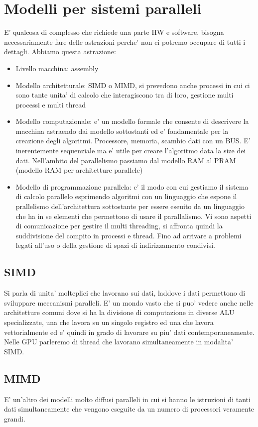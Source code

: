 \section{Modelli per sistemi paralleli}
E' qualcosa di complesso che richiede una parte HW e software, bisogna necessariamente fare delle astrazioni perche' non ci potremo occupare di tutti i dettagli.
Abbiamo questa astrazione:
\begin{itemize}
    \item Livello macchina: assembly
    \item Modello architetturale: SIMD o MIMD, si prevedono anche processi in cui ci sono tante unita' di calcolo che interagiscono tra di loro, gestione multi processi e multi thread
    \item Modello computazionale: e' un modello formale che consente di descrivere la macchina astraendo dai modello sottostanti ed e' fondamentale per la creazione degli algoritmi. Processore, memoria, scambio dati con un BUS. E' inerentemente sequenziale ma e' utile per creare l'algoritmo data la size dei dati. Nell'ambito del parallelismo passiamo dal modello RAM al PRAM (modello RAM per architetture parallele)
    \item Modello di programmazione parallela: e' il modo con cui gestiamo il sistema di calcolo parallelo esprimendo algoritmi con un linguaggio che espone il prallelismo dell'architettura sottostante per essere eseuito da un linguaggio che ha in se elementi che permettono di usare il parallalismo. Vi sono aspetti di comunicazione per gestire il multi threading, si affronta quindi la suddivisione del compito in processi e thread. Fino ad arrivare a problemi legati all'uso o della gestione di spazi di indirizzamento condivisi.
\end{itemize}

\subsection{SIMD}
Si parla di unita' molteplici che lavorano sui dati, laddove i dati permettono di sviluppare meccanismi paralleli. E' un mondo vasto che si puo' vedere anche nelle architetture comuni dove si ha la divisione di computazione in diverse ALU specializzate, una che lavora su un singolo registro ed una che lavora vettorialmente ed e' quindi in grado di lavorare su piu' dati contemporaneamente. Nelle GPU parleremo di thread che lavorano simultaneamente in modalita' SIMD.

\subsection{MIMD}
E' un'altro dei modelli molto diffusi paralleli in cui si hanno le istruzioni di tanti dati simultaneamente che vengono eseguite da un numero di processori veramente grandi.

